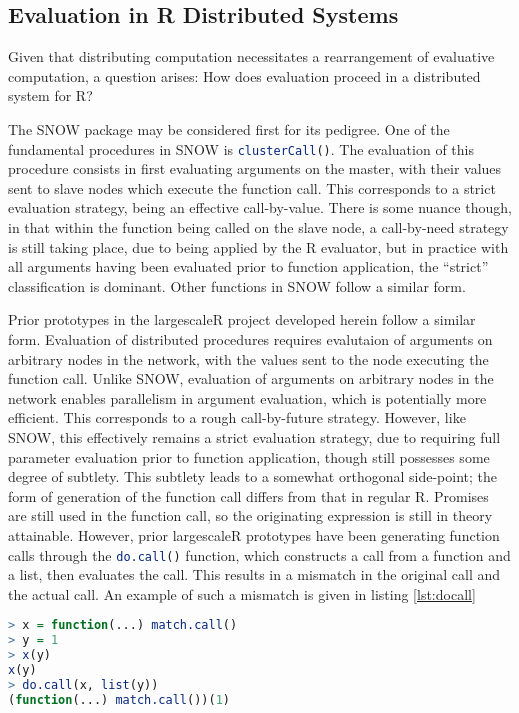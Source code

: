 \subsection{Evaluation in R Distributed Systems}\label{sec:rdisteval}

Given that distributing computation necessitates a rearrangement of evaluative computation, a question arises: How does evaluation proceed in a distributed system for R?

The SNOW package may be considered first for its pedigree.
One of the fundamental procedures in SNOW is \lstinline[language=R]{clusterCall()}\cite{tierney2018snow}.
The evaluation of this procedure consists in first evaluating arguments on the master, with their values sent to slave nodes which execute the function call.
This corresponds to a strict evaluation strategy, being an effective call-by-value.
There is some nuance though, in that within the function being called on the slave node, a call-by-need strategy is still taking place, due to being applied by the R evaluator, but in practice with all arguments having been evaluated prior to function application, the ``strict'' classification is dominant.
Other functions in SNOW follow a similar form.

Prior prototypes in the largescaleR project developed herein follow a similar form.
Evaluation of distributed procedures requires evalutaion of arguments on arbitrary nodes in the network, with the values sent to the node executing the function call.
Unlike SNOW, evaluation of arguments on arbitrary nodes in the network enables parallelism in argument evaluation, which is potentially more efficient.
This corresponds to a rough call-by-future strategy.
However, like SNOW, this effectively remains a strict evaluation strategy, due to requiring full parameter evaluation prior to function application, though still possesses some degree of subtlety.
This subtlety leads to a somewhat orthogonal side-point; the form of generation of the function call differs from that in regular R.
Promises are still used in the function call, so the originating expression is still in theory attainable.
However, prior largescaleR prototypes have been generating function calls through the \lstinline[language=R]{do.call()} function, which constructs a call from a function and a list, then evaluates the call.
This results in a mismatch in the original call and the actual call.
An example of such a mismatch is given in listing \cref{lst:docall}

\begin{lstlisting}[language=R,float,caption={A mismatch in an actual call and one generated with do.call},label=lst:docall]
> x = function(...) match.call()
> y = 1
> x(y)
x(y)
> do.call(x, list(y))
(function(...) match.call())(1)
\end{lstlisting}

